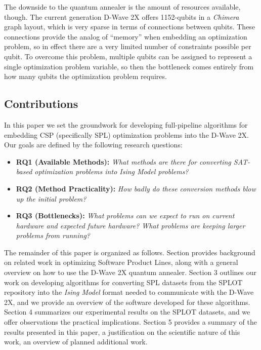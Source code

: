 \documentclass{sig-alternate-05-2015}
\begin{document}
The downside to the quantum annealer is the amount of resources available, though. The current generation D-Wave 2X offers 1152-qubits in a \emph{Chimera} graph layout, which is very sparse in terms of connections between qubits. These connections provide the analog of ``memory'' when embedding an optimization problem, so in effect there are a very limited number of constraints possible per qubit. To overcome this problem, multiple qubits can be assigned to represent a single optimization problem variable, so then the bottleneck comes entirely from how many qubits the optimization problem requires.

\subsection{Contributions}
In this paper we set the groundwork for developing full-pipeline algorithms for embedding CSP (specifically SPL) optimization problems into the D-Wave 2X. Our goals are defined by the following research questions:

\begin{itemize}
\item \textbf{RQ1 (Available Methods):} \emph{What methods are there for converting SAT-based optimization problems into Ising Model problems?}
\item \textbf{RQ2 (Method Practicality):} \emph{How badly do these conversion methods blow up the initial problem?}
\item \textbf{RQ3 (Bottlenecks):} \emph{What problems can we expect to run on current hardware and expected future hardware? What problems are keeping larger problems from running?}
\end{itemize}

The remainder of this paper is organized as follows. Section provides background on related work in optimizing Software Product Lines, along with a general overview on how to use the D-Wave 2X quantum annealer. Section 3 outlines our work on developing algorithms for converting SPL datasets from the SPLOT repository into the \emph{Ising Model} format needed to communicate with the D-Wave 2X, and we provide an overview of the software developed for these algorithms. Section 4 summarizes our experimental results on the SPLOT datasets, and we offer observations the practical implications. Section 5 provides a summary of the results presented in this paper, a justification on the scientific nature of this work, an overview of planned additional work.
\end{document}
